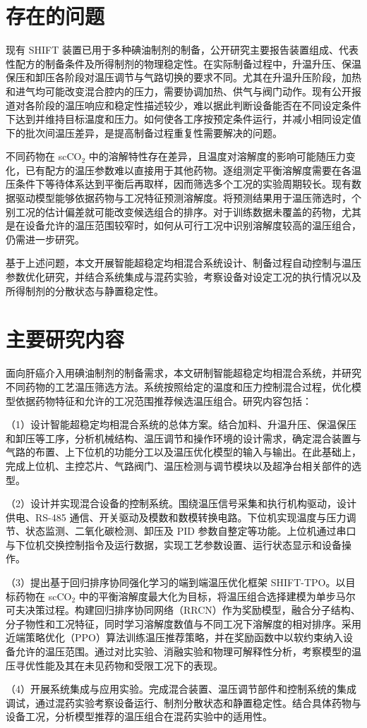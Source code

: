 \section{存在的问题}

现有 SHIFT 装置已用于多种碘油制剂的制备，公开研究主要报告装置组成、代表性配方的制备条件及所得制剂的物理稳定性。在实际制备过程中，升温升压、保温保压和卸压各阶段对温压调节与气路切换的要求不同。尤其在升温升压阶段，加热和进气均可能改变混合腔内的压力，需要协调加热、供气与阀门动作。现有公开报道对各阶段的温压响应和稳定性描述较少，难以据此判断设备能否在不同设定条件下达到并维持目标温度和压力。如何使各工序按预定条件运行，并减小相同设定值下的批次间温压差异，是提高制备过程重复性需要解决的问题。

不同药物在 scCO$_2$ 中的溶解特性存在差异，且温度对溶解度的影响可能随压力变化，已有配方的温压参数难以直接用于其他药物。逐组测定平衡溶解度需要在各温压条件下等待体系达到平衡后再取样，因而筛选多个工况的实验周期较长。现有数据驱动模型能够依据药物与工况特征预测溶解度。将预测结果用于温压筛选时，个别工况的估计偏差就可能改变候选组合的排序。对于训练数据未覆盖的药物，尤其是在设备允许的温压范围较窄时，如何从可行工况中识别溶解度较高的温压组合，仍需进一步研究。

基于上述问题，本文开展智能超稳定均相混合系统设计、制备过程自动控制与温压参数优化研究，并结合系统集成与混药实验，考察设备对设定工况的执行情况以及所得制剂的分散状态与静置稳定性。

\section{主要研究内容}

面向肝癌介入用碘油制剂的制备需求，本文研制智能超稳定均相混合系统，并研究不同药物的工艺温压筛选方法。系统按照给定的温度和压力控制混合过程，优化模型依据药物特征和允许的工况范围推荐候选温压组合。研究内容包括：

（1）设计智能超稳定均相混合系统的总体方案。结合加料、升温升压、保温保压和卸压等工序，分析机械结构、温压调节和操作环境的设计需求，确定混合装置与气路的布置、上下位机的功能分工以及温压优化模型的输入与输出。在此基础上，完成上位机、主控芯片、气路阀门、温压检测与调节模块以及超净台相关部件的选型。

（2）设计并实现混合设备的控制系统。围绕温压信号采集和执行机构驱动，设计供电、RS-485 通信、开关驱动及模数和数模转换电路。下位机实现温度与压力调节、状态监测、二氧化碳检测、卸压及 PID 参数自整定等功能。上位机通过串口与下位机交换控制指令及运行数据，实现工艺参数设置、运行状态显示和设备操作。

（3）提出基于回归排序协同强化学习的端到端温压优化框架 SHIFT-TPO。以目标药物在 scCO$_2$ 中的平衡溶解度最大化为目标，将温压组合选择建模为单步马尔可夫决策过程。构建回归排序协同网络（RRCN）作为奖励模型，融合分子结构、分子物性和工况特征，同时学习溶解度数值与不同工况下溶解度的相对排序。采用近端策略优化（PPO）算法训练温压推荐策略，并在奖励函数中以软约束纳入设备允许的温压范围。通过对比实验、消融实验和物理可解释性分析，考察模型的温压寻优性能及其在未见药物和受限工况下的表现。

（4）开展系统集成与应用实验。完成混合装置、温压调节部件和控制系统的集成调试，通过混药实验考察设备运行、制剂分散状态和静置稳定性。结合具体药物与设备工况，分析模型推荐的温压组合在混药实验中的适用性。
